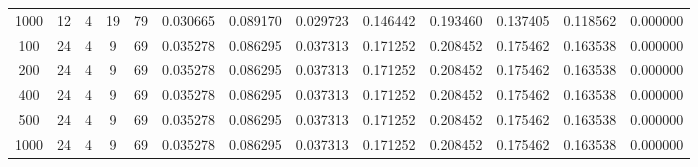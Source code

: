 \begin{table}[h]
\begin{tabular}{ccccccccccccc}
1000 & 12 & 4 & 19 & 79 & 0.030665 & 0.089170 & 0.029723 & 0.146442 & 0.193460 & 0.137405 & 0.118562 & 0.000000 \\
100 & 24 & 4 & 9 & 69 & 0.035278 & 0.086295 & 0.037313 & 0.171252 & 0.208452 & 0.175462 & 0.163538 & 0.000000 \\
200 & 24 & 4 & 9 & 69 & 0.035278 & 0.086295 & 0.037313 & 0.171252 & 0.208452 & 0.175462 & 0.163538 & 0.000000 \\
400 & 24 & 4 & 9 & 69 & 0.035278 & 0.086295 & 0.037313 & 0.171252 & 0.208452 & 0.175462 & 0.163538 & 0.000000 \\
500 & 24 & 4 & 9 & 69 & 0.035278 & 0.086295 & 0.037313 & 0.171252 & 0.208452 & 0.175462 & 0.163538 & 0.000000 \\
1000 & 24 & 4 & 9 & 69 & 0.035278 & 0.086295 & 0.037313 & 0.171252 & 0.208452 & 0.175462 & 0.163538 & 0.000000 \\
\bottomrule
\end{tabular}
\end{table}
